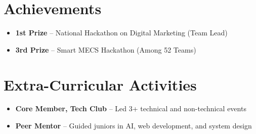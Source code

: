\documentclass[9.5pt,a4paper]{article} %
\begin{document}
\section*{Achievements}
\begin{itemize}
    \item \textbf{1st Prize} – National Hackathon on Digital Marketing (Team Lead)
    \item \textbf{3rd Prize} – Smart MECS Hackathon (Among 52 Teams)
\end{itemize}

\section*{Extra-Curricular Activities}
\begin{itemize}
    \item \textbf{Core Member, Tech Club} – Led 3+ technical and non-technical events
    \item \textbf{Peer Mentor} – Guided juniors in AI, web development, and system design
\end{itemize}
\end{document}
